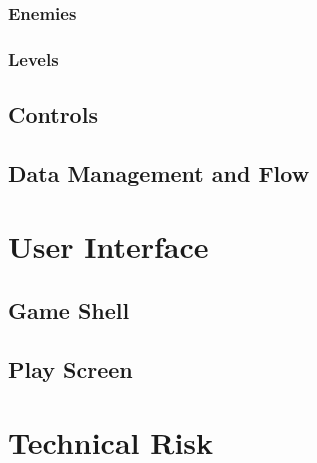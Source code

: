 \documentclass{article}
\begin{document}
\subsubsection{Enemies}

\subsubsection{Levels}

\subsection{Controls}%

\subsection{Data Management and Flow}

\section{User Interface}

\subsection{Game Shell}

\subsection{Play Screen}

\section{Technical Risk}
\end{document}
